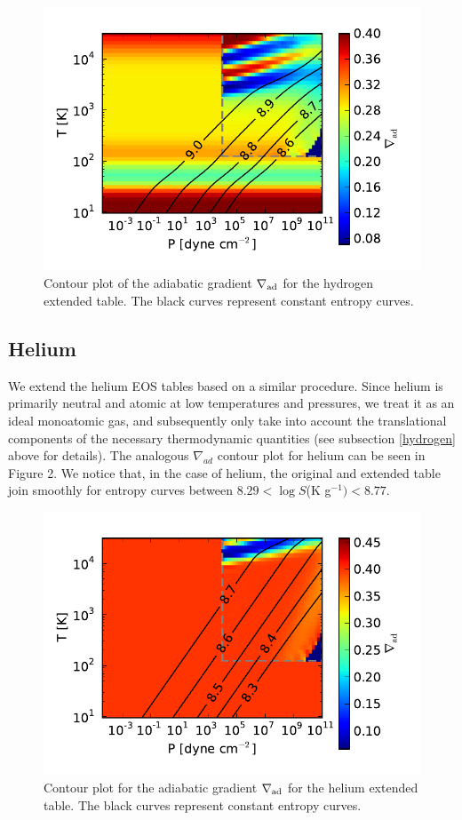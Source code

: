 \documentclass[apj]{emulateapj}
\newcommand{\delad}{\nabla_{\rm ad}}
\begin{document}
\begin{figure}[h!]
\centering
\includegraphics[scale=.8]{../../figs/ModelAtmospheres/RadSelfGravRealEOS/PaperFigs/delad_S_H.pdf}
\caption{Contour plot of the adiabatic gradient $\delad$ for the hydrogen extended table. The black curves represent constant entropy curves.}
\end{figure}

\subsection{Helium}

We extend the helium EOS tables based on a similar procedure. Since helium is primarily neutral and atomic at low temperatures and pressures, we treat it as an ideal monoatomic gas, and subsequently only take into account the translational components of the necessary thermodynamic quantities (see subsection \ref{hydrogen} above for details). The analogous $\nabla_{ad}$ contour plot for helium can be seen in Figure 2. We notice that, in the case of helium, the original and extended table join smoothly for entropy curves between $8.29<\log{S}$(K g$^{-1})<8.77$.

\begin{figure}[h!]
\centering
\includegraphics[scale=.8]{../../figs/ModelAtmospheres/RadSelfGravRealEOS/PaperFigs/delad_S_He.pdf}
\caption{Contour plot for the adiabatic gradient $\delad$ for the helium extended table. The black curves represent constant entropy curves.}
\end{figure}
\end{document}
